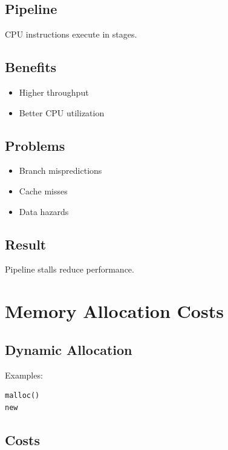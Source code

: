 \subsection{Pipeline}

CPU instructions execute in stages.

\subsection{Benefits}

\begin{itemize}
\item Higher throughput
\item Better CPU utilization
\end{itemize}

\subsection{Problems}

\begin{itemize}
\item Branch mispredictions
\item Cache misses
\item Data hazards
\end{itemize}

\subsection{Result}

Pipeline stalls reduce performance.

\section{Memory Allocation Costs}

\subsection{Dynamic Allocation}

Examples:

\begin{verbatim}
malloc()
new
\end{verbatim}

\subsection{Costs}

